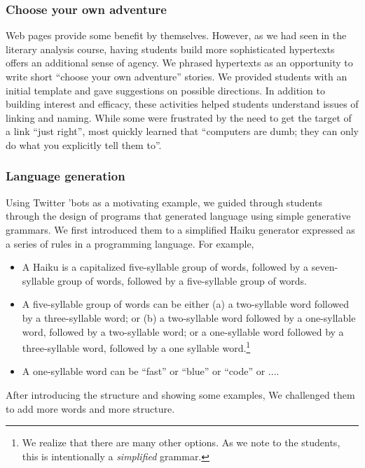 \subsubsection{Choose your own adventure}

Web pages provide some benefit by themselves.  However, as we had seen
in the literary analysis course, having students build more sophisticated
hypertexts offers an additional sense of agency.  We phrased hypertexts
as an opportunity to write short ``choose your own adventure'' stories.
We provided students with an initial template and gave suggestions on
possible directions.  In addition to building interest and efficacy, these
activities helped students understand issues of linking and naming.
While some were frustrated by the need to get the target of a link
``just right'', most quickly learned that ``computers are dumb; they
can only do what you explicitly tell them to''.

\subsubsection{Language generation}

Using Twitter 'bots as a motivating example, we guided through
students through the design of programs that generated language
using simple generative grammars.  We first introduced them to a
simplified Haiku generator expressed as a series of rules in a
programming language.  For example,

\begin{itemize}
\item A Haiku is a capitalized five-syllable group of words, followed
  by a seven-syllable group of words, followed by a five-syllable
  group of words.
\item A five-syllable group of words can be either (a) a two-syllable
  word followed by a three-syllable word; or (b) a two-syllable word
  followed by a one-syllable word, followed by a two-syllable word;
  or a one-syllable word followed by a three-syllable word, followed
  by a one syllable word.\footnote{We realize that there are many
  other options.  As we note to the students, this is intentionally
  a \textit{simplified} grammar.}
\item A one-syllable word can be ``fast'' or ``blue'' or ``code'' or ....
\end{itemize}

After introducing the structure and showing some examples, We
challenged them to add more words and more structure.

